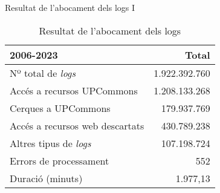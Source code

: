\begin{frame}{Resultat de l'abocament dels logs I}
    \begin{table}[!t]
        \caption{Resultat de l'abocament dels logs}\label{tab:table1}
        \centering
        \begin{tabular}{@{} lr @{}}
            \toprule
            \textbf{2006-2023} & Total\\
            \midrule
            Nº total de \textit{logs}       & 1.922.392.760\\
            Accés a recursos UPCommons      & 1.208.133.268\\
            Cerques a UPCommons             & 179.937.769\\
            Accés a recursos web descartats & 430.789.238\\
            Altres tipus de \textit{logs}   & 107.198.724\\
            Errors de processament          & 552\\
            Duració (minuts)                & 1.977,13\\
            \bottomrule
        \end{tabular}
    \end{table}
\end{frame}

